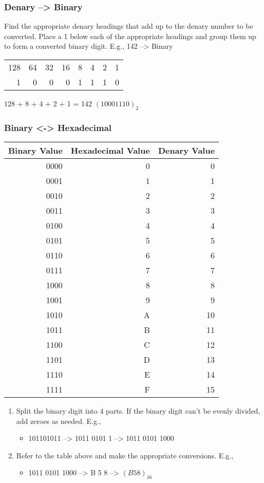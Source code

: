 \documentclass[11pt]{article}
\begin{document}
\subsubsection{Denary --> Binary}
\label{sec:org8181cb2}
Find the appropriate denary headings that add up to the denary number to be converted. Place a 1 below each of the appropriate headings and group them up to form a converted binary digit. E.g., 142 --> Binary
\begin{center}
\begin{tabular}{rrrrrrrr}
128 & 64 & 32 & 16 & 8 & 4 & 2 & 1\\
1 & 0 & 0 & 0 & 1 & 1 & 1 & 0\\
\end{tabular}
\end{center}
128 + 8 + 4 + 2 + 1 = 142
\((10001110)_2\)
\subsubsection{Binary <-> Hexadecimal}
\label{sec:org84d587c}
\begin{center}
\begin{tabular}{rrr}
Binary Value & Hexadecimal Value & Denary Value\\
\hline
0000 & 0 & 0\\
0001 & 1 & 1\\
0010 & 2 & 2\\
0011 & 3 & 3\\
0100 & 4 & 4\\
0101 & 5 & 5\\
0110 & 6 & 6\\
0111 & 7 & 7\\
1000 & 8 & 8\\
1001 & 9 & 9\\
1010 & A & 10\\
1011 & B & 11\\
1100 & C & 12\\
1101 & D & 13\\
1110 & E & 14\\
1111 & F & 15\\
\end{tabular}
\end{center}
\begin{enumerate}
\item Split the binary digit into 4 parts. If the binary digit can't be evenly divided, add zeroes as needed. E.g.,
\begin{itemize}
\item 101101011 --> 1011 0101 1 --> 1011 0101 1000
\end{itemize}
\item Refer to the table above and make the appropriate conversions. E.g.,
\begin{itemize}
\item 1011 0101 1000 --> B 5 8 --> \((B58)_{16}\)
\end{itemize}
\end{enumerate}
\end{document}
